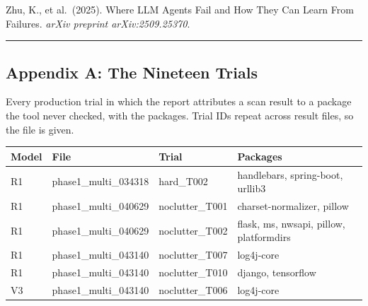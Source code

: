 \documentclass[
]{article}
\newcounter{none} %
\begin{document}
Zhu, K., et al.~(2025). Where LLM Agents Fail and How They Can Learn
From Failures. \emph{arXiv preprint arXiv:2509.25370}.

\begin{center}\rule{0.5\linewidth}{0.5pt}\end{center}

\subsection{Appendix A: The Nineteen
Trials}\label{appendix-a-the-nineteen-trials}

Every production trial in which the report attributes a scan result to a
package the tool never checked, with the packages. Trial IDs repeat
across result files, so the file is given.

{\def\LTcaptype{none} %
\begin{longtable}[]{@{}
  >{\raggedright\arraybackslash}p{}
  >{\raggedright\arraybackslash}p{}
  >{\raggedright\arraybackslash}p{}
  >{\raggedright\arraybackslash}p{}@{}}
\toprule\noalign{}
\begin{minipage}[b]{\linewidth}\raggedright
Model
\end{minipage} & \begin{minipage}[b]{\linewidth}\raggedright
File
\end{minipage} & \begin{minipage}[b]{\linewidth}\raggedright
Trial
\end{minipage} & \begin{minipage}[b]{\linewidth}\raggedright
Packages
\end{minipage} \\
\midrule\noalign{}
\endhead
\bottomrule\noalign{}
\endlastfoot
R1 & phase1\_multi\_034318 & hard\_T002 & handlebars, spring-boot,
urllib3 \\
R1 & phase1\_multi\_040629 & noclutter\_T001 & charset-normalizer,
pillow \\
R1 & phase1\_multi\_040629 & noclutter\_T002 & flask, ms, nwsapi,
pillow, platformdirs \\
R1 & phase1\_multi\_043140 & noclutter\_T007 & log4j-core \\
R1 & phase1\_multi\_043140 & noclutter\_T010 & django, tensorflow \\
V3 & phase1\_multi\_043140 & noclutter\_T006 & log4j-core \\

\end{longtable}}
\end{document}
